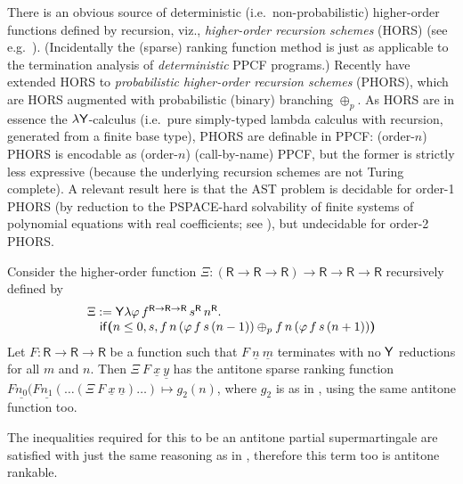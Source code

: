 There is an obvious source of deterministic (i.e.~non-probabilistic) higher-order functions defined by recursion, viz., \emph{higher-order recursion schemes} (HORS) (see e.g.~\cite{DBLP:conf/lics/Ong06,DBLP:conf/lics/Ong15}).
(Incidentally the (sparse) ranking function method is just as applicable to the termination analysis of \emph{deterministic} PPCF programs.)
Recently \cite{DBLP:conf/lics/KobayashiLG19} have extended HORS to \emph{probabilistic higher-order recursion schemes} (PHORS), which are HORS augmented with probabilistic (binary) branching $\oplus_p$.
As HORS are in essence the $\lambda \mathsf{Y}$-calculus \cite{DBLP:conf/lics/Statman02} (i.e.~pure simply-typed lambda calculus with recursion, generated from a finite base type), PHORS are definable in PPCF:
(order-$n$) PHORS is encodable as (order-$n$) (call-by-name) PPCF, but the former is strictly less expressive (because the underlying recursion schemes are not Turing complete). 
A relevant result here is that the AST problem is decidable for order-1 PHORS (by reduction to the PSPACE-hard solvability of finite systems of polynomial equations with real coefficients; see \cite{DBLP:journals/jacm/EtessamiY09}), but undecidable for order-2 PHORS.

Consider the higher-order function
$\Xi : (\textsf{R} \to \textsf{R} \to \textsf{R}) \to \textsf{R} \to \textsf{R} \to \textsf{R}$
recursively defined by
\[
\begin{array}{l}
\Xi := \mathsf{Y} \lambda \varphi \, f^{\textsf{R} \to \textsf{R} \to \textsf{R}} \, s^\textsf{R} \, n^\textsf{R} . \\
\quad\mathsf{if}\boldsymbol{(}n \leq 0, s, 
f \, n \, (\varphi \, f \, s \, (n - 1))
\oplus_p
f \, n \, (\varphi \, f \, s \, (n + 1))
\boldsymbol{)}
\end{array}
\]
Let $F : \textsf{R} \to \textsf{R} \to \textsf{R}$ be a function such that $F\ \underline n\ \underline m$ terminates with no $\mathsf{Y}$ reductions for all $m$ and $n$. Then $\Xi\ F\ \underline x\ \underline y$ has the antitone sparse ranking function $F \underline{n_0} (F \underline{n_1} (\dots(\Xi\ F\ \underline x\ \underline n)\dots) \mapsto g_2(n)$, where $g_2$ is as in , using the same antitone function too.

The inequalities required for this to be an antitone partial supermartingale are satisfied with just the same reasoning as in , therefore this term too is antitone rankable.

